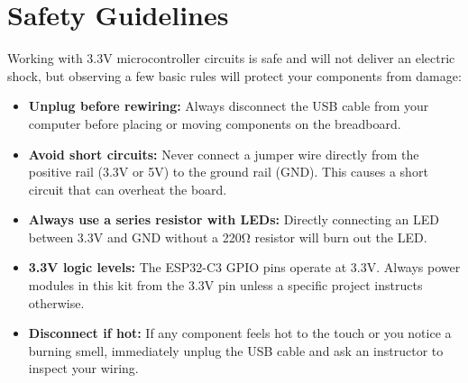 \section{Safety Guidelines}

Working with 3.3V microcontroller circuits is safe and will not deliver an electric shock, but observing
a few basic rules will protect your components from damage:

\begin{itemize}
    \item \textbf{Unplug before rewiring:} Always disconnect the USB cable from your computer before placing
    or moving components on the breadboard.
    \item \textbf{Avoid short circuits:} Never connect a jumper wire directly from the positive rail (3.3V or 5V)
    to the ground rail (GND). This causes a short circuit that can overheat the board.
    \item \textbf{Always use a series resistor with LEDs:} Directly connecting an LED between 3.3V and GND
    without a 220\si{\ohm} resistor will burn out the LED.
    \item \textbf{3.3V logic levels:} The ESP32-C3 GPIO pins operate at 3.3V. Always power modules in this kit
    from the 3.3V pin unless a specific project instructs otherwise.
    \item \textbf{Disconnect if hot:} If any component feels hot to the touch or you notice a burning smell,
    immediately unplug the USB cable and ask an instructor to inspect your wiring.
\end{itemize}
